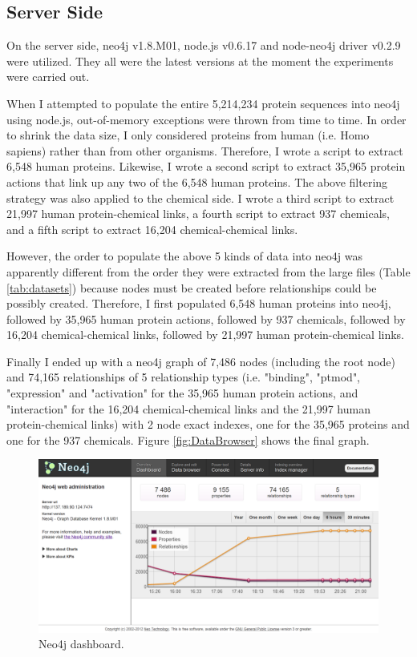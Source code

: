 \documentclass[10pt,conference,compsocconf]{../IEEEtran}
\begin{document}
\subsection{Server Side}

On the server side, neo4j v1.8.M01, node.js v0.6.17 and node-neo4j driver v0.2.9 were utilized. They all were the latest versions at the moment the experiments were carried out.

When I attempted to populate the entire 5,214,234 protein sequences into neo4j using node.js, out-of-memory exceptions were thrown from time to time. In order to shrink the data size, I only considered proteins from human (i.e. Homo sapiens) rather than from other organisms. Therefore, I wrote a script to extract 6,548 human proteins. Likewise, I wrote a second script to extract 35,965 protein actions that link up any two of the 6,548 human proteins. The above filtering strategy was also applied to the chemical side. I wrote a third script to extract 21,997 human protein-chemical links, a fourth script to extract 937 chemicals, and a fifth script to extract 16,204 chemical-chemical links.

However, the order to populate the above 5 kinds of data into neo4j was apparently different from the order they were extracted from the large files (Table \ref{tab:datasets}) because nodes must be created before relationships could be possibly created. Therefore, I first populated 6,548 human proteins into neo4j, followed by 35,965 human protein actions, followed by 937 chemicals, followed by 16,204 chemical-chemical links, followed by 21,997 human protein-chemical links.

Finally I ended up with a neo4j graph of 7,486 nodes (including the root node) and 74,165 relationships of 5 relationship types (i.e. "binding", "ptmod", "expression" and "activation" for the 35,965 human protein actions, and "interaction" for the 16,204 chemical-chemical links and the 21,997 human protein-chemical links) with 2 node exact indexes, one for the 35,965 proteins and one for the 937 chemicals. Figure \ref{fig:DataBrowser} shows the final graph.

\begin{figure}
\centering
\includegraphics[width=\linewidth]{Dashboard.png}
\caption{Neo4j dashboard.}
\label{fig:Dashboard}
\end{figure}
\end{document}
